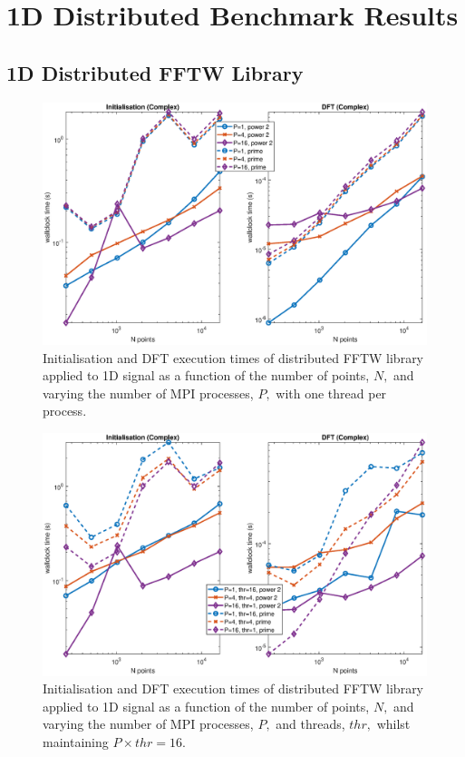 \documentclass[a4paper]{article}
\begin{document}
\section{1D Distributed Benchmark Results}\label{Sec:1DDistr}


\subsection{1D Distributed FFTW Library}\label{Sec:1DDistFFTW}

\begin{figure}[htb]
    \centering
    \includegraphics[width=\linewidth]{../results/fftw_1d_mpi.eps}
  \caption{Initialisation and DFT execution times of distributed FFTW library applied to 1D signal as a function of the
    number of points, $N,$ and varying the number of MPI processes, $P,$ with one thread per process.}
  \label{1DDistFFTW}
\end{figure}

\begin{figure}[htb]
    \centering
    \includegraphics[width=\linewidth]{../results/fftw_1d_mpi_thr.eps}
  \caption{Initialisation and DFT execution times of distributed FFTW library applied to 1D signal as a function of the
    number of points, $N,$ and varying the number of MPI processes, $P,$ and threads, $thr,$ whilst maintaining $P\times thr=16.$}
  \label{1DDistFFTW16}
\end{figure}
\end{document}

